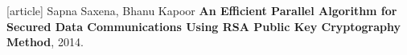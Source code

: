 \documentclass{beamer}c
\begin{document}
\begin{frame}
\begin{thebibliography}{}
[article]
 Sapna Saxena, Bhanu Kapoor \textbf{An Efficient Parallel Algorithm for Secured Data Communications Using RSA Public Key Cryptography Method}, 2014.
\end{thebibliography}
\end{frame}
\end{document}
